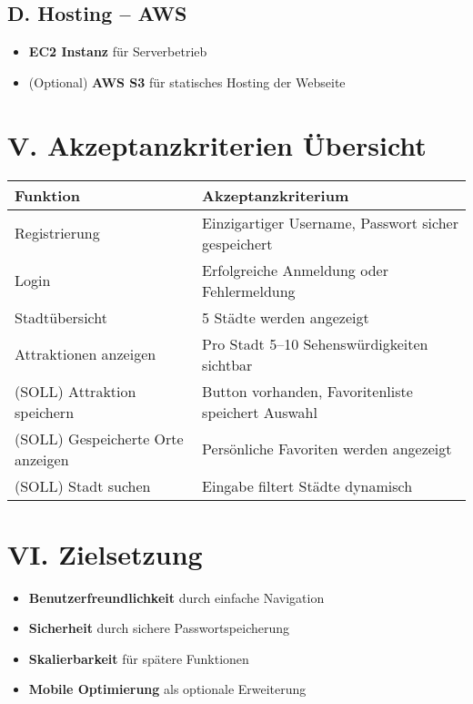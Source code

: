 \documentclass[a4paper,12pt]{article}
\begin{document}
    \subsection*{D. Hosting – AWS}
    \begin{itemize}
        \item \textbf{EC2 Instanz} für Serverbetrieb
        \item (Optional) \textbf{AWS S3} für statisches Hosting der Webseite
    \end{itemize}

    \section*{V. Akzeptanzkriterien Übersicht}

    \begin{longtable}{|p{6cm}|p{8cm}|}
        \hline
        \textbf{Funktion} & \textbf{Akzeptanzkriterium} \\
        \hline
        Registrierung & Einzigartiger Username, Passwort sicher gespeichert \\
        \hline
        Login & Erfolgreiche Anmeldung oder Fehlermeldung \\
        \hline
        Stadtübersicht & 5 Städte werden angezeigt \\
        \hline
        Attraktionen anzeigen & Pro Stadt 5–10 Sehenswürdigkeiten sichtbar \\
        \hline
        (SOLL) Attraktion speichern & Button vorhanden, Favoritenliste speichert Auswahl \\
        \hline
        (SOLL) Gespeicherte Orte anzeigen & Persönliche Favoriten werden angezeigt \\
        \hline
        (SOLL) Stadt suchen & Eingabe filtert Städte dynamisch \\
        \hline
    \end{longtable}

    \section*{VI. Zielsetzung}
    \begin{itemize}
        \item \textbf{Benutzerfreundlichkeit} durch einfache Navigation
        \item \textbf{Sicherheit} durch sichere Passwortspeicherung
        \item \textbf{Skalierbarkeit} für spätere Funktionen
        \item \textbf{Mobile Optimierung} als optionale Erweiterung
    \end{itemize}
\end{document}
